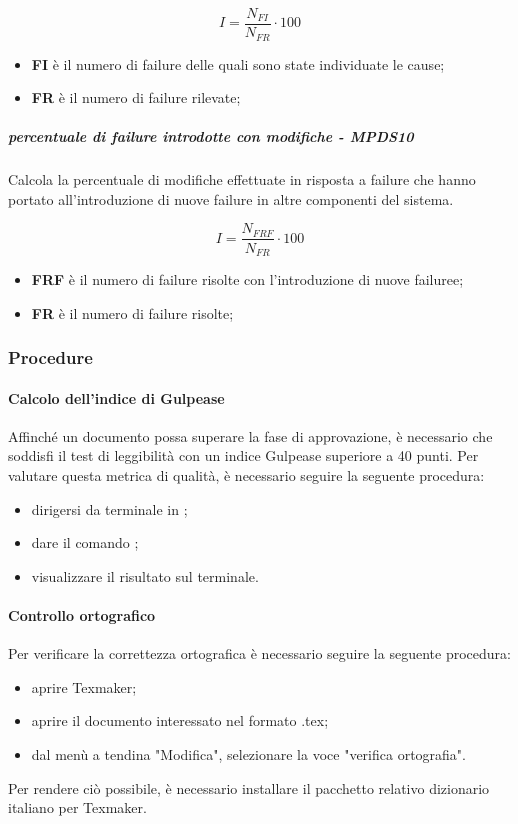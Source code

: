 \begin{equation*}I=\frac{N_{FI}}{N_{FR}} \cdot 100 \end{equation*}
\begin{itemize}
	\item \textbf{FI}  è il numero di failure delle quali sono state individuate le cause;
	\item \textbf{FR} è il numero di failure rilevate;
\end{itemize}
\subparagraph{percentuale di failure introdotte con modifiche - MPDS10}
Calcola la percentuale di modifiche effettuate in risposta a failure che hanno portato all'introduzione di nuove failure in altre componenti del sistema.

\begin{equation*}I=\frac{N_{FRF}}{N_{FR}} \cdot 100 \end{equation*}
\begin{itemize}
	\item \textbf{FRF}  è il numero di failure risolte con l'introduzione di nuove failuree;
	\item \textbf{FR} è il numero di failure risolte;
\end{itemize}

\subsubsection{Procedure}
\paragraph{Calcolo dell'indice di Gulpease}
Affinché un documento possa superare la fase di approvazione, è necessario che soddisfi il test di leggibilità con un indice Gulpease superiore a 40 punti. Per valutare questa metrica di qualità, è necessario seguire la seguente procedura:
\begin{itemize}
	\item dirigersi da terminale in \GulScript{};
	\item dare il comando ;
	\item visualizzare il risultato sul terminale.
\end{itemize}
\paragraph{Controllo ortografico}
Per verificare la correttezza ortografica è necessario seguire la seguente procedura:
\begin{itemize}
	\item aprire Texmaker;
	\item aprire il documento interessato nel formato .tex;
	\item dal menù a tendina "Modifica", selezionare la voce "verifica ortografia".
\end{itemize}
Per rendere ciò possibile, è necessario installare il pacchetto relativo dizionario italiano per Texmaker.
